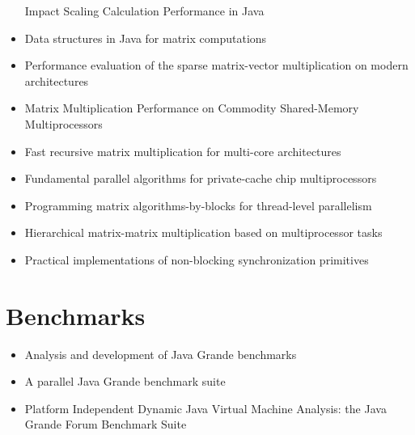 \begin{itemize}
  Impact Scaling Calculation Performance in Java \cite{Kim2010}
\item Data structures in Java for matrix computations
  \cite{Gundersen2004}
\item Performance evaluation of the sparse matrix-vector
  multiplication on modern architectures \cite{Goumas2009}
\item Matrix Multiplication Performance on Commodity Shared-Memory
  Multiprocessors \cite{Tsilikas2004}
\item Fast recursive matrix multiplication for multi-core
  architectures \cite{Runger2010}
\item Fundamental parallel algorithms for private-cache chip
  multiprocessors \cite{Arge2008}
\item Programming matrix algorithms-by-blocks for thread-level
  parallelism \cite{Quintana-Orti2009}
\item Hierarchical matrix-matrix multiplication based on
  multiprocessor tasks \cite{Hunold2004}
\item Practical implementations of non-blocking synchronization
  primitives \cite{Moir1997}
\end{itemize}


\section*{Benchmarks}
\label{sec:lr-benchmarks}

\begin{itemize}
\item[\checkmark] Analysis and development of Java Grande benchmarks
  \cite{Mathew1999}
\item[\checkmark] A parallel Java Grande benchmark suite
  \cite{Smith2001}
\item[\checkmark] Platform Independent Dynamic Java Virtual Machine
  Analysis: the Java Grande Forum Benchmark Suite \cite{Gregg2003}
\end{itemize}


